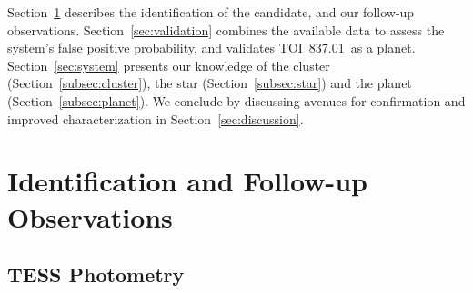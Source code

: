 \documentclass[12pt,twocolumn,tighten]{aastex63}
\newcommand{\pn}{TOI~837.01} %
\begin{document}
Section~\ref{sec:observations} describes the identification of the
candidate, and our follow-up observations.
Section~\ref{sec:validation} combines the available data to assess the
system's false positive probability, and validates \pn\ as a planet.
Section~\ref{sec:system} presents our knowledge of the cluster
(Section~\ref{subsec:cluster}), the star (Section~\ref{subsec:star})
and the planet (Section~\ref{subsec:planet}).  We conclude by
discussing avenues for confirmation and improved characterization in
Section~\ref{sec:discussion}.



\section{Identification and Follow-up Observations}
\label{sec:observations}


\subsection{TESS Photometry}
\label{subsec:tess}
\end{document}
